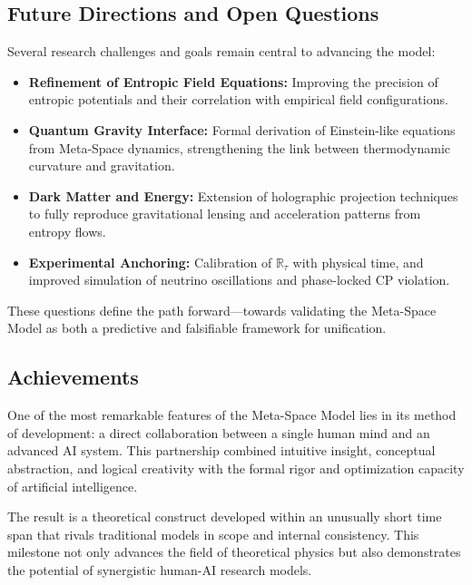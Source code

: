 \documentclass[10.5pt,a4paper]{article}
\begin{document}
\subsection{Future Directions and Open Questions}

Several research challenges and goals remain central to advancing the model:
\begin{itemize}
    \item \textbf{Refinement of Entropic Field Equations:} Improving the precision of entropic potentials and their correlation with empirical field configurations.
    
    \item \textbf{Quantum Gravity Interface:} Formal derivation of Einstein-like equations from Meta-Space dynamics, strengthening the link between thermodynamic curvature and gravitation.
    
    \item \textbf{Dark Matter and Energy:} Extension of holographic projection techniques to fully reproduce gravitational lensing and acceleration patterns from entropy flows.
    
    \item \textbf{Experimental Anchoring:} Calibration of \( \mathbb{R}_\tau \) with physical time, and improved simulation of neutrino oscillations and phase-locked CP violation.
\end{itemize}

These questions define the path forward—towards validating the Meta-Space Model as both a predictive and falsifiable framework for unification.

\subsection{Achievements}

One of the most remarkable features of the Meta-Space Model lies in its method of development: a direct collaboration between a single human mind and an advanced AI system. This partnership combined intuitive insight, conceptual abstraction, and logical creativity with the formal rigor and optimization capacity of artificial intelligence.

The result is a theoretical construct developed within an unusually short time span that rivals traditional models in scope and internal consistency. This milestone not only advances the field of theoretical physics but also demonstrates the potential of synergistic human-AI research models.
\end{document}
